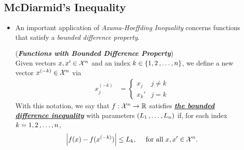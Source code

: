 \documentclass[11pt]{article}
\begin{document}
\subsection{McDiarmid's Inequality}
\begin{itemize}
\item An important application of \emph{Azuma-Hoeffding Inequality} concerns functions that satisfy a \emph{bounded difference property}. 
\begin{definition} (\textbf{\emph{Functions with Bounded Difference Property}})\\
Given vectors $x, x' \in {\mathcal X}^n$ and an index $k \in \left\{1, 2 \,{,}\ldots{,}\, n\right\}$, we define a new vector $x^{(-k)} \in {\mathcal X}^n$ via
\begin{align*}
x_j^{(-k)} &= \left\{\begin{array}{cc}
x_j & j \neq k\\
x_k'& j = k
\end{array}
\right.
\end{align*}
With this notation, we say that $f: {\mathcal X}^n \to {\mathbb R}$ satisfies \underline{\textbf{\emph{the bounded difference inequality}}} with parameters $(L_1 \,{,}\ldots{,}\, L_n)$ if, for each index $k = 1, 2 \,{,}\ldots{,}\, n$,
\begin{align}
\left\lvert f(x) - f(x^{(-k)}) \right\rvert \le L_k, \quad\text{ for all }x, x' \in {\mathcal X}^n. \label{eqn: bounded_difference_property}
\end{align}
\end{definition}



\end{itemize}
\end{document}
